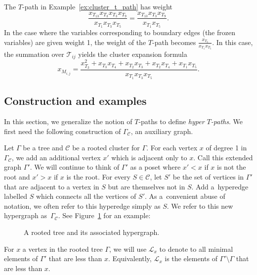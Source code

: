 \documentclass[pdftex]{sigma}
\numberwithin{equation}{section}
\begin{document}
\begin{Example}
The $T$-path in Example~\ref{ex:cluster_t_path} has weight \[\frac{x_{T_{13}}x_{T_3}x_{T_3}x_{T_9}}{x_{T_1}x_{T_3}x_{T_5}}=\frac{x_{T_{13}}x_{T_3}x_{T_9}}{x_{T_1}x_{T_5}}.\] In the case where the variables corresponding to boundary edges (the frozen variables) are given weight 1, the weight of the $T$-path becomes $\frac{x_{T_3}}{x_{T_1}x_{T_5}}.$ In this case, the summation over $\mathcal{T}_{ij}$ yields the cluster expansion formula
\[ x_{M_{i,j}} = \frac{x_{T_3}^2 + x_{T_3}x_{T_4} + x_{T_2}x_{T_3} + x_{T_2}x_{T_4} + x_{T_1}x_{T_5}}{x_{T_1}x_{T_3}x_{T_5}}.\]
\end{Example}

\subsection{Construction and examples}\label{sec:gen-T-paths}

In this section, we generalize the notion of $T$-paths to define \emph{hyper $T$-paths}. We first need the following construction of $\Gamma_{\mathcal{C}}$, an auxiliary graph.

Let $\Gamma$ be a tree and $\mathcal{C}$ be a rooted cluster for $\Gamma$. For each vertex $x$ of degree 1 in $\Gamma_{\mathcal{C}}$, we add an additional vertex $x'$ which is adjacent only to $x$. Call this extended graph $\Gamma'$. We will continue to think of $\Gamma'$ as a poset where $x'<x$ if $x$ is not the root and $x'>x$ if $x$ is the root. For every $S\in\mathcal{C}$, let $S'$ be the set of vertices in $\Gamma'$ that are adjacent to a vertex in $S$ but are themselves not in $S$. Add a~hyperedge labelled $S$ which connects all the vertices of $S'$. As a~convenient abuse of notation, we often refer to this hyperedge simply as $S$. We refer to this new hypergraph as~$\Gamma_{\mathcal{C}}$. See Figure~\ref{fig:example_hypergraph} for an example:

\begin{figure}[h]
 \centering
{}
\quad\quad
{}
\caption{A rooted tree and its associated hypergraph.}
\label{fig:example_hypergraph}
\end{figure}

For $x$ a vertex in the rooted tree $\Gamma$, we will use $\mathcal{L}_x$ to denote to all minimal elements of $\Gamma'$ that are less than $x$. Equivalently, $\mathcal{L}_x$ is the elements of $\Gamma'\setminus\Gamma$ that are less than $x$.
\end{document}
